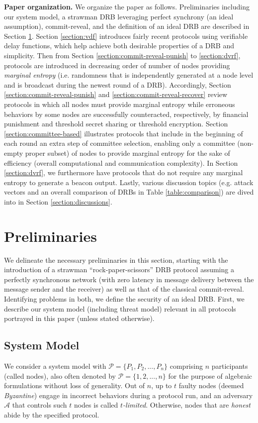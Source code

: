 \documentclass[letterpaper,twocolumn,10pt]{article}
\theoremstyle{definition}
\theoremstyle{remark}
\begin{document}
\textbf{Paper organization.} We organize the paper as follows. Preliminaries including our system model, a strawman DRB leveraging perfect synchrony (an ideal assumption), commit-reveal, and the definition of an ideal DRB are described in Section \ref{section:preliminaries}. Section \ref{section:vdf} introduces fairly recent protocols using verifiable delay functions, which help achieve both desirable properties of a DRB and simplicity. Then from Section \ref{section:commit-reveal-punish} to \ref{section:dvrf}, protocols are introduced in decreasing order of number of nodes providing \textit{marginal entropy} (i.e. randomness that is independently generated at a node level and is broadcast during the newest round of a DRB). Accordingly, Section \ref{section:commit-reveal-punish} and \ref{section:commit-reveal-recover} review protocols in which all nodes must provide marginal entropy while erroneous behaviors by some nodes are successfully counteracted, respectively, by financial punishment and threshold secret sharing or threshold encryption. Section \ref{section:committee-based} illustrates protocols that include in the beginning of each round an extra step of committee selection, enabling only a committee (non-empty proper subset) of nodes to provide marginal entropy for the sake of efficiency (overall computational and communication complexity). In Section \ref{section:dvrf}, we furthermore have protocols that do not require any marginal entropy to generate a beacon output. Lastly, various discussion topics (e.g. attack vectors and an overall comparison of DRBs in Table \ref{table:comparison}) are dived into in Section \ref{section:discussions}.

\section{Preliminaries}
\label{section:preliminaries}
We delineate the necessary preliminaries in this section, starting with the introduction of a strawman ``rock-paper-scissors'' DRB protocol assuming a perfectly synchronous network (with zero latency in message delivery between the message sender and the receiver) as well as that of the classical commit-reveal. Identifying problems in both, we define the security of an ideal DRB. First, we describe our system model (including threat model) relevant in all protocols portrayed in this paper (unless stated otherwise).

\subsection{System Model}
We consider a system model with $\mathcal{P} = \{P_1, P_2, ..., P_n\}$ comprising $n$ participants (called nodes), also often denoted by $\mathcal{P} = \{1, 2, ..., n\}$ for the purpose of algebraic formulations without loss of generality. Out of $n$, up to $t$ faulty nodes (deemed \textit{Byzantine}) engage in incorrect behaviors during a protocol run, and an adversary $\mathcal{A}$ that controls such $t$ nodes is called \textit{$t$-limited}. Otherwise, nodes that are \textit{honest} abide by the specified protocol.
\end{document}
